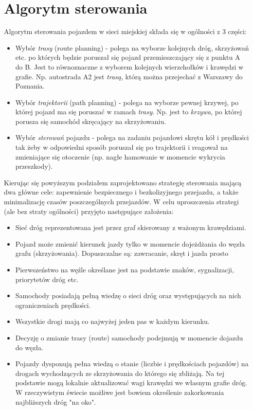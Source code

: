 \newpage
\section{Algorytm sterowania}

Algorytm sterowania pojazdem w sieci miejskiej składa się w ogólności z 3 części:

\begin{itemize}
	\item 
	Wybór \textit{trasy} (route planning) - polega na wyborze kolejnych dróg, skrzyżowań etc. po których będzie poruszał się pojazd przemieszczający się z punktu A do B. Jest to równoznaczne z wyborem kolejnych wierzchołków i krawędzi w grafie. Np. autostrada A2 jest \textit{trasą}, którą można przejechać z Warszawy do Poznania. 
	\item 
	Wybór \textit{trajektorii} (path planning) - polega na wyborze pewnej krzywej, po której pojazd ma się poruszać w ramach \textit{trasy}. Np. jest to \textit{krzywa}, po której porusza się samochód skręcający na skrzyżowaniu.
	\item 
	Wybór \textit{sterowań} pojazdu - polega na zadaniu pojazdowi skrętu kół i prędkości tak żeby w odpowiedni sposób poruszał się po trajektorii i reagował na zmieniające się otoczenie (np. nagłe hamowanie w momencie wykrycia przeszkody).
\end{itemize}

Kierując się powyższym podziałem zaprojektowano strategię sterowania mającą dwa główne cele: zapewnienie bezpiecznego i bezkolizyjnego przejazdu, a także minimalizację czasów poszczególnych przejazdów. W celu uproszczenia strategi (ale bez straty ogólności) przyjęto następujące założenia:

\begin{itemize}
	\item 
	Sieć dróg reprezentowana jest przez graf skierowany z ważonym krawędziami.	
	\item 
	Pojazd może zmienić kierunek jazdy tylko w momencie dojeżdżania do węzła grafu (skrzyżowania). Dopuszczalne są: zawracanie, skręt i jazda prosto 
	\item 
	Pierwszeństwo na węźle określane jest na podstawie znaków, sygnalizacji, priorytetów dróg etc.
	\item 
	Samochody posiadają pełną wiedzę o sieci dróg oraz występujących na nich ograniczeniach prędkości.
	\item 
	Wszystkie drogi mają co najwyżej jeden pas w każdym kierunku.
	\item 
	Decyzję o zmianie trasy (route) samochody podejmują	w momencie dojazdu do węzła.
	\item
	Pojazdy dysponują pełna wiedzą o stanie (liczbie i prędkościach pojazdów) na drogach wychodzących ze skrzyżowania do którego się zbliżają. Na tej podstawie mogą lokalnie aktualizować wagi krawędzi we własnym grafie dróg. W rzeczywistym świecie możliwe jest bowiem określenie zakorkowania najbliższych dróg "na oko".
	
\end{itemize}

